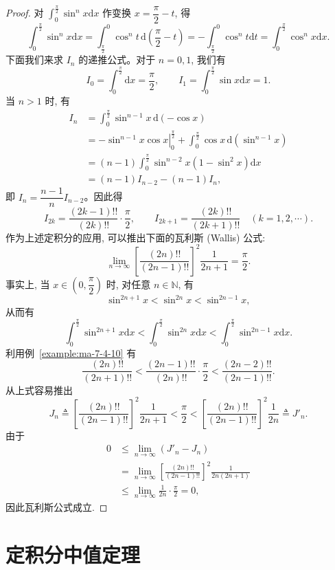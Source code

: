 \begin{proof}
对 $\int_0^{\frac{\pi}{2}}\sin^n x\mathrm dx$ 作变换 $x=\dfrac{\pi}{2}-t$, 得
\[
  \int_0^{\frac{\pi}{2}}\sin^n x\mathrm dx
  =\int_{\frac{\pi}{2}}^0 \cos^n t\,\mathrm d\left(\frac{\pi}{2}-t\right)
  =-\int_{\frac{\pi}{2}}^0 \cos^n t\mathrm dt
  =\int_0^{\frac{\pi}{2}}\cos^n x\mathrm dx.
\]
下面我们来求 $I_n$ 的递推公式。对于 $n=0,1$, 我们有
\[
  I_0=\int_0^{\frac{\pi}{2}}\mathrm dx=\frac{\pi}{2},\qquad
  I_1=\int_0^{\frac{\pi}{2}}\sin x\mathrm dx=1.
\]
当 $n>1$ 时, 有
\[
\begin{aligned}
  I_n&=\int_0^{\frac{\pi}{2}}\sin^{n-1}x\,\mathrm d(-\cos x)\\
  &=-\left.\sin^{n-1}x\cos x\right|_0^{\frac{\pi}{2}}
  +\int_0^{\frac{\pi}{2}}\cos x\,\mathrm d(\sin^{n-1}x)\\
  &=(n-1)\int_0^{\frac{\pi}{2}}\sin^{n-2}x(1-\sin^2x)\mathrm dx\\
  &=(n-1)I_{n-2}-(n-1)I_n,
\end{aligned}
\]
即 $I_n=\dfrac{n-1}{n}I_{n-2}$。因此得
\[
  I_{2k}=\frac{(2k-1)!!}{(2k)!!}\cdot\frac{\pi}{2},\qquad
  I_{2k+1}=\frac{(2k)!!}{(2k+1)!!}\quad(k=1,2,\cdots).
\]
作为上述定积分的应用, 可以推出下面的瓦利斯 (Wallis) 公式:
\[
  \lim_{n\to\infty}\left[\frac{(2n)!!}{(2n-1)!!}\right]^2\frac{1}{2n+1}=\frac{\pi}{2}.
\]
事实上, 当 $x\in\left(0,\dfrac{\pi}{2}\right)$ 时, 对任意 $n\in\mathbb N$, 有
\[
  \sin^{2n+1}x<\sin^{2n}x<\sin^{2n-1}x,
\]
从而有
\[
  \int_0^{\frac{\pi}{2}}\sin^{2n+1}x\mathrm dx
  <\int_0^{\frac{\pi}{2}}\sin^{2n}x\mathrm dx
  <\int_0^{\frac{\pi}{2}}\sin^{2n-1}x\mathrm dx.
\]
利用例~\ref{example:ma-7-4-10} 有
\[
  \frac{(2n)!!}{(2n+1)!!}
  <\frac{(2n-1)!!}{(2n)!!}\cdot\frac{\pi}{2}
  <\frac{(2n-2)!!}{(2n-1)!!}.
\]
从上式容易推出
\[
  J_n\triangleq\left[\frac{(2n)!!}{(2n-1)!!}\right]^2\frac{1}{2n+1}
  <\frac{\pi}{2}
  <\left[\frac{(2n)!!}{(2n-1)!!}\right]^2\frac{1}{2n}\triangleq J'_n.
\]
由于
\[
\begin{aligned}
  0&\leq\lim_{n\to\infty}(J'_n-J_n)\\
  &=\lim_{n\to\infty}
  \left[\frac{(2n)!!}{(2n-1)!!}\right]^2\frac{1}{2n(2n+1)}\\
  &\leq\lim_{n\to\infty}\frac{1}{2n}\cdot\frac{\pi}{2}=0,
\end{aligned}
\]
因此瓦利斯公式成立.
\end{proof}


\section{定积分中值定理}
\label{sec:ma-7-5}

